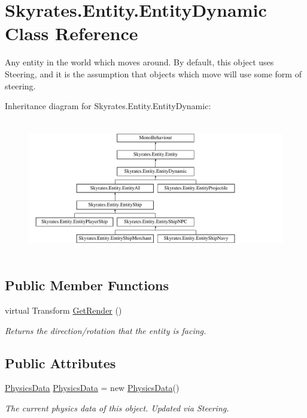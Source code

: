 \hypertarget{class_skyrates_1_1_entity_1_1_entity_dynamic}{\section{Skyrates.\-Entity.\-Entity\-Dynamic Class Reference}
\label{class_skyrates_1_1_entity_1_1_entity_dynamic}
}


Any entity in the world which moves around. By default, this object uses Steering, and it is the assumption that objects which move will use some form of steering.  


Inheritance diagram for Skyrates.\-Entity.\-Entity\-Dynamic\-:\begin{figure}[H]
\begin{center}
\leavevmode
\includegraphics[height=5.993884cm]{class_skyrates_1_1_entity_1_1_entity_dynamic}
\end{center}
\end{figure}
\subsection*{Public Member Functions}
\begin{DoxyCompactItemize}
\item 
virtual Transform \hyperlink{class_skyrates_1_1_entity_1_1_entity_dynamic_aa692ff9f52d25cb79e7df05533ea1360}{Get\-Render} ()
\begin{DoxyCompactList}\small\item\em Returns the direction/rotation that the entity is facing. \end{DoxyCompactList}\end{DoxyCompactItemize}
\subsection*{Public Attributes}
\begin{DoxyCompactItemize}
\item 
\hyperlink{class_skyrates_1_1_physics_1_1_physics_data}{Physics\-Data} \hyperlink{class_skyrates_1_1_entity_1_1_entity_dynamic_ad02fdf789b5c8db16054651b9ff54bff}{Physics\-Data} = new \hyperlink{class_skyrates_1_1_physics_1_1_physics_data}{Physics\-Data}()
\begin{DoxyCompactList}\small\item\em The current physics data of this object. Updated via Steering. \end{DoxyCompactList}\end{DoxyCompactItemize}
